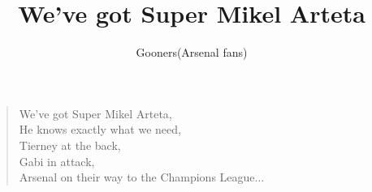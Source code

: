 \documentclass[a4paper,12pt]{article}
\title{We've got Super Mikel Arteta}
\author{Gooners(Arsenal fans)}
\date{}
\begin{document}
	
	\maketitle
	
	\begin{verse}
		
		We've got Super Mikel Arteta, \\
		He knows exactly what we need, \\
		Tierney at the back, \\
		Gabi in attack, \\
		Arsenal on their way to the Champions League$\ldots$
		
	\end{verse}
	
\end{document}
